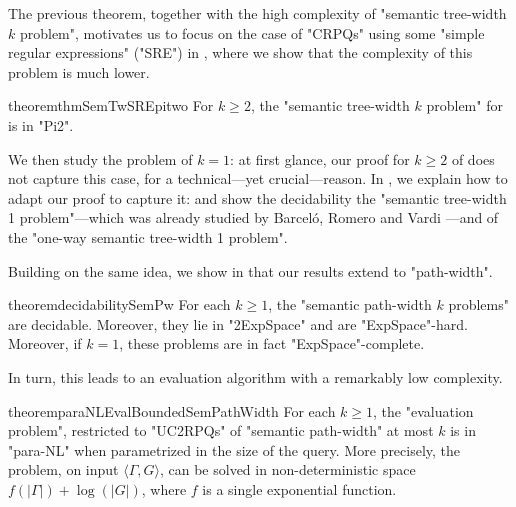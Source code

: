 
The previous theorem, together with the high complexity of "semantic tree-width $k$ problem",
motivates us to focus on the case of "CRPQs" using some "simple regular expressions" ("SRE") in , where we show that the complexity of this problem is much lower.

\begin{restatable*}{theorem}{thmSemTwSREpitwo}
    \AP\label{thm:semtw-sre-pitwo}
    For $k\geq 2$, the "semantic tree-width $k$ problem" for {\UCRPQSRE} is in "Pi2".
\end{restatable*}

We then study the problem of $k=1$: at first glance, our proof for $k\geq 2$ of
 does not capture this case, for a technical---yet crucial---reason. In
, we explain how to adapt our proof to capture it: 
and show the decidability the "semantic tree-width 1 problem"---which was already studied by 
Barceló, Romero and Vardi \cite{BarceloRomeroVardi2016SemanticAcyclicity}---and of the "one-way semantic tree-width 1 problem". 

Building on the same idea, we show in  that our results extend to "path-width".
\begin{restatable*}{theorem}{decidabilitySemPw}
    \AP\label{thm:decidability-sempw}
    For each $k \geq 1$,
    the "semantic path-width $k$ problems" are decidable. Moreover, they lie in "2ExpSpace"
    and are "ExpSpace"-hard. Moreover, if $k=1$, these problems are in fact "ExpSpace"-complete.
\end{restatable*}
In turn, this leads to an evaluation algorithm with a remarkably low complexity.
\begin{restatable*}{theorem}{paraNLEvalBoundedSemPathWidth}
	\AP\label{thm:evaluation-bounded-pathwidth}
	For each $k \geq 1$, the "evaluation problem", restricted to "UC2RPQs" of
	"semantic path-width" at most $k$ is in "para-NL" when parametrized in the size of the query.
	More precisely, the problem, on input $\langle \Gamma, G \rangle$, can be solved in
	non-deterministic space $f(|\Gamma|) + \log(|G|)$, where $f$ is a single exponential
	function.
\end{restatable*}

